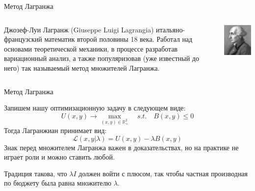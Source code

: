 \documentclass{beamer}
\begin{document}
\begin{frame}{Метод Лагранжа}

\begin{columns}
\begin{column}{0.5\textwidth}
   \alert{Джозеф-Луи Лагранж} (Giuseppe Luigi Lagrangia) итальяно-французский математик второй половины 18 века. Работал над основами теоретической механики, в процессе разработав вариационный анализ, а также популяризовав (уже известный до него) так называемый \alert{метод множителей Лагранжа}.
\end{column}
\begin{column}{0.5\textwidth}  %
    \begin{center}
     \includegraphics[width=1\textwidth]{Lagrange.png}
     \end{center}
\end{column}
\end{columns}

\end{frame}

\begin{frame}{Метод Лагранжа}

Запишем нашу оптимизационную задачу в следующем виде:
$$ U(x, y) \to \max_{(x,y) \in \mathbb{R}^2_{+}} \quad s.t.\quad  B(x,y) \leqslant 0$$
Тогда \alert{Лагранжиан} принимает вид:
$$ \mathcal{L}(x, y | \lambda) = U(x,y) - \lambda B(x,y)$$
Знак перед множителем Лагранжа важен в доказательствах, но на практике не играет роли и можно ставить любой.

Традиция такова, что $\lambda I$ должен войти с плюсом, так чтобы частная производная по бюджету была равна множителю $\lambda$.

\end{frame}
\end{document}
